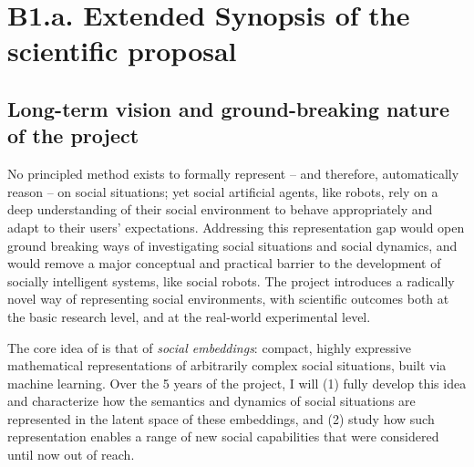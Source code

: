 
\newrefsection


\chapter{B1.a. Extended Synopsis of the scientific proposal}\label{part1}



\section{Long-term vision and ground-breaking nature of the project}


\noindent No principled method exists to formally represent -- and therefore,
automatically reason -- on social situations; yet social artificial agents,
like robots, rely on a deep understanding of their social environment to
behave appropriately and adapt to their users' expectations. Addressing this
representation gap would open ground breaking ways of investigating social
situations and social dynamics, and would remove a major conceptual and practical
barrier to the development of socially intelligent systems, like social robots.
The \project project introduces a radically novel way of representing social
environments, with scientific outcomes both at the basic research level, and
at the real-world experimental level. 

The core idea of \project is that of \emph{social embeddings}: compact, highly
expressive mathematical representations of arbitrarily complex social
situations, built via machine learning. Over the 5 years of the project, I
will (1) fully develop this idea and characterize how the semantics and dynamics of
social situations are represented in the latent space of these embeddings,
and (2) study how such representation enables a range of new social capabilities that
were considered until now out of reach.

